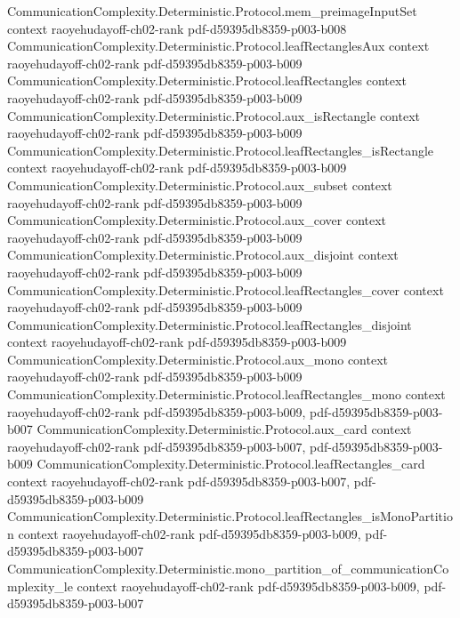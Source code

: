 \begin{theorem}
\proofstep
  {CommunicationComplexity.Deterministic.Protocol.mem_preimageInputSet}
  {context}
  {raoyehudayoff-ch02-rank}
  {pdf-d59395db8359-p003-b008}
\proofstep
  {CommunicationComplexity.Deterministic.Protocol.leafRectanglesAux}
  {context}
  {raoyehudayoff-ch02-rank}
  {pdf-d59395db8359-p003-b009}
\proofstep
  {CommunicationComplexity.Deterministic.Protocol.leafRectangles}
  {context}
  {raoyehudayoff-ch02-rank}
  {pdf-d59395db8359-p003-b009}
\proofstep
  {CommunicationComplexity.Deterministic.Protocol.aux_isRectangle}
  {context}
  {raoyehudayoff-ch02-rank}
  {pdf-d59395db8359-p003-b009}
\proofstep
  {CommunicationComplexity.Deterministic.Protocol.leafRectangles_isRectangle}
  {context}
  {raoyehudayoff-ch02-rank}
  {pdf-d59395db8359-p003-b009}
\proofstep
  {CommunicationComplexity.Deterministic.Protocol.aux_subset}
  {context}
  {raoyehudayoff-ch02-rank}
  {pdf-d59395db8359-p003-b009}
\proofstep
  {CommunicationComplexity.Deterministic.Protocol.aux_cover}
  {context}
  {raoyehudayoff-ch02-rank}
  {pdf-d59395db8359-p003-b009}
\proofstep
  {CommunicationComplexity.Deterministic.Protocol.aux_disjoint}
  {context}
  {raoyehudayoff-ch02-rank}
  {pdf-d59395db8359-p003-b009}
\proofstep
  {CommunicationComplexity.Deterministic.Protocol.leafRectangles_cover}
  {context}
  {raoyehudayoff-ch02-rank}
  {pdf-d59395db8359-p003-b009}
\proofstep
  {CommunicationComplexity.Deterministic.Protocol.leafRectangles_disjoint}
  {context}
  {raoyehudayoff-ch02-rank}
  {pdf-d59395db8359-p003-b009}
\proofstep
  {CommunicationComplexity.Deterministic.Protocol.aux_mono}
  {context}
  {raoyehudayoff-ch02-rank}
  {pdf-d59395db8359-p003-b009}
\proofstep
  {CommunicationComplexity.Deterministic.Protocol.leafRectangles_mono}
  {context}
  {raoyehudayoff-ch02-rank}
  {pdf-d59395db8359-p003-b009,
    pdf-d59395db8359-p003-b007}
\proofstep
  {CommunicationComplexity.Deterministic.Protocol.aux_card}
  {context}
  {raoyehudayoff-ch02-rank}
  {pdf-d59395db8359-p003-b007,
    pdf-d59395db8359-p003-b009}
\proofstep
  {CommunicationComplexity.Deterministic.Protocol.leafRectangles_card}
  {context}
  {raoyehudayoff-ch02-rank}
  {pdf-d59395db8359-p003-b007,
    pdf-d59395db8359-p003-b009}
\proofstep
  {CommunicationComplexity.Deterministic.Protocol.leafRectangles_isMonoPartition}
  {context}
  {raoyehudayoff-ch02-rank}
  {pdf-d59395db8359-p003-b009,
    pdf-d59395db8359-p003-b007}
\proofstep
  {CommunicationComplexity.Deterministic.mono_partition_of_communicationComplexity_le}
  {context}
  {raoyehudayoff-ch02-rank}
  {pdf-d59395db8359-p003-b009,
    pdf-d59395db8359-p003-b007}
\proofstep

\end{theorem}
